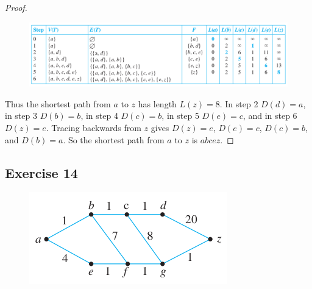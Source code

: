 \documentclass[14pt]{extarticle}
\begin{document}
\begin{proof}
\begin{figure}[ht!]
\centering
\includegraphics[scale=0.5]{../images/10.6.13.2.png}
\end{figure}

Thus the shortest path from \(a\) to \(z\) has length \(L(z) = 8\). In step 2 \(D(d) = a\), in step 3 \(D(b) = b\), in step 4 
\(D(c) = b\), in step 5 \(D(e) = c\), and in step 6 \(D(z) = e\). Tracing backwards from \(z\) gives \(D(z) = e\), 
\(D(e) = c\), \(D(c) = b\), and \(D(b) = a\). So the shortest path from \(a\) to \(z\) is \(abcez\).
\end{proof}

\subsection{Exercise 14}
\begin{figure}[ht!]
\centering
\includegraphics[scale=0.6]{../images/10.6.14.png}
\end{figure}
\end{document}
